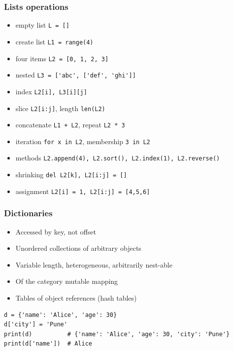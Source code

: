 \begin{frame}[fragile]\frametitle{Lists operations}
  \begin{itemize}
  \item empty list \lstinline{L = []}
    \item create list \lstinline{L1 = range(4)}
  \item four items \lstinline{L2 = [0, 1, 2, 3]}
  \item nested \lstinline{L3 = ['abc', ['def', 'ghi']]}
  \item index \lstinline{L2[i], L3[i][j]}
  \item slice  \lstinline{L2[i:j]}, length \lstinline{len(L2)}
  \item concatenate \lstinline{L1 + L2}, repeat \lstinline{L2 * 3}
  \item iteration \lstinline{for x in L2}, membership \lstinline{3 in L2}
  \item methods \lstinline{L2.append(4), L2.sort(), L2.index(1), L2.reverse()}
  \item shrinking \lstinline{del L2[k], L2[i:j] = []}
  \item assignment \lstinline{L2[i] = 1, L2[i:j] = [4,5,6]}

  \end{itemize}
\end{frame}

\begin{frame}[fragile]\frametitle{Dictionaries}
  \begin{itemize}
  \item Accessed by key, not offset
  \item Unordered collections of arbitrary objects
  \item Variable length, heterogeneous, arbitrarily nest-able
  \item Of the category mutable mapping
  \item Tables of object references (hash tables)
  \end{itemize}
  \begin{lstlisting}
d = {'name': 'Alice', 'age': 30}
d['city'] = 'Pune'
print(d)          # {'name': 'Alice', 'age': 30, 'city': 'Pune'}
print(d['name'])  # Alice
  \end{lstlisting}
\end{frame}


